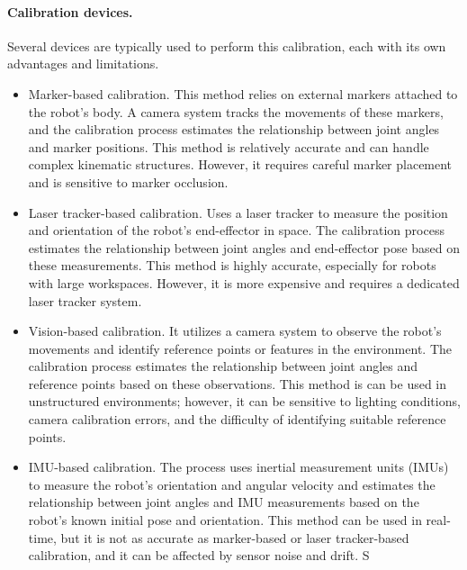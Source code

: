 \paragraph*{Calibration devices.} %
Several devices are typically used to perform this calibration, each with its own advantages and limitations.
\begin{itemize}
	\item Marker-based calibration.  This method relies on external markers attached to the robot's body. A camera system tracks the movements of these markers, and the calibration process estimates the relationship between joint angles and marker positions. This method is relatively accurate and can handle complex kinematic structures. However, it requires careful marker placement and is sensitive to marker occlusion.
	\item Laser tracker-based calibration. Uses a laser tracker to measure the position and orientation of the robot's end-effector in space. The calibration process estimates the relationship between joint angles and end-effector pose based on these measurements. This method is highly accurate, especially for robots with large workspaces. However, it is more expensive and requires a dedicated laser tracker system.
	\item Vision-based calibration. It utilizes a camera system to observe the robot's movements and identify reference points or features in the environment. The calibration process estimates the relationship between joint angles and reference points based on these observations. This method is can be used in unstructured environments; however, it can be sensitive to lighting conditions, camera calibration errors, and the difficulty of identifying suitable reference points.
	\item IMU-based calibration. The process uses inertial measurement units (IMUs) to measure the robot's orientation and angular velocity and estimates the relationship between joint angles and IMU measurements based on the robot's known initial pose and orientation. This method can be used in real-time, but it is not as accurate as marker-based or laser tracker-based calibration, and it can be affected by sensor noise and drift.	
S\end{itemize}



